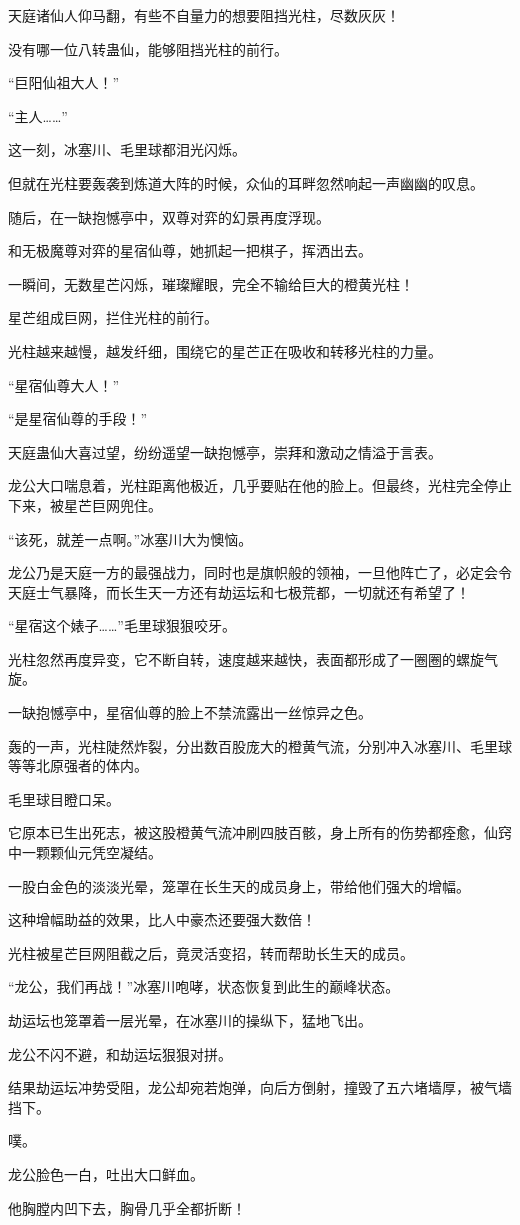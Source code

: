 \begin{this_body}
天庭诸仙人仰马翻，有些不自量力的想要阻挡光柱，尽数灰灰！

没有哪一位八转蛊仙，能够阻挡光柱的前行。

“巨阳仙祖大人！”

“主人……”

这一刻，冰塞川、毛里球都泪光闪烁。

但就在光柱要轰袭到炼道大阵的时候，众仙的耳畔忽然响起一声幽幽的叹息。

随后，在一缺抱憾亭中，双尊对弈的幻景再度浮现。

和无极魔尊对弈的星宿仙尊，她抓起一把棋子，挥洒出去。

一瞬间，无数星芒闪烁，璀璨耀眼，完全不输给巨大的橙黄光柱！

星芒组成巨网，拦住光柱的前行。

光柱越来越慢，越发纤细，围绕它的星芒正在吸收和转移光柱的力量。

“星宿仙尊大人！”

“是星宿仙尊的手段！”

天庭蛊仙大喜过望，纷纷遥望一缺抱憾亭，崇拜和激动之情溢于言表。

龙公大口喘息着，光柱距离他极近，几乎要贴在他的脸上。但最终，光柱完全停止下来，被星芒巨网兜住。

“该死，就差一点啊。”冰塞川大为懊恼。

龙公乃是天庭一方的最强战力，同时也是旗帜般的领袖，一旦他阵亡了，必定会令天庭士气暴降，而长生天一方还有劫运坛和七极荒都，一切就还有希望了！

“星宿这个婊子……”毛里球狠狠咬牙。

光柱忽然再度异变，它不断自转，速度越来越快，表面都形成了一圈圈的螺旋气旋。

一缺抱憾亭中，星宿仙尊的脸上不禁流露出一丝惊异之色。

轰的一声，光柱陡然炸裂，分出数百股庞大的橙黄气流，分别冲入冰塞川、毛里球等等北原强者的体内。

毛里球目瞪口呆。

它原本已生出死志，被这股橙黄气流冲刷四肢百骸，身上所有的伤势都痊愈，仙窍中一颗颗仙元凭空凝结。

一股白金色的淡淡光晕，笼罩在长生天的成员身上，带给他们强大的增幅。

这种增幅助益的效果，比人中豪杰还要强大数倍！

光柱被星芒巨网阻截之后，竟灵活变招，转而帮助长生天的成员。

“龙公，我们再战！”冰塞川咆哮，状态恢复到此生的巅峰状态。

劫运坛也笼罩着一层光晕，在冰塞川的操纵下，猛地飞出。

龙公不闪不避，和劫运坛狠狠对拼。

结果劫运坛冲势受阻，龙公却宛若炮弹，向后方倒射，撞毁了五六堵墙厚，被气墙挡下。

噗。

龙公脸色一白，吐出大口鲜血。

他胸膛内凹下去，胸骨几乎全都折断！

\end{this_body}

